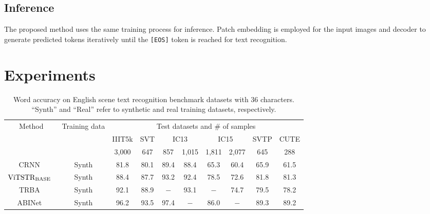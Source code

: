\documentclass[10pt,twocolumn,letterpaper]{article}
\begin{document}
\subsection{Inference}
The proposed method uses the same training process for inference. 
Patch embedding is employed for the input images and decoder to generate predicted tokens iteratively until the \texttt{[EOS]} token is reached for text recognition. 
\section{Experiments} \label{experiments}
\begin{table*}[tb]

\centering
   \caption{
Word accuracy on English scene text recognition benchmark datasets with 36 characters. 
``Synth'' and ``Real'' refer to synthetic and real training datasets, respectively.
}
\label{tab:method_overall_result_english}
\begin{tabular}{cccccccccc}
\toprule
\multirow{3}{*}{Method} &\multirow{3}{*}{Training data} & \multicolumn{8}{c}{Test datasets and \# of samples}                                                                                                                                                                \\ \cline{3-10} 
&                         & IIIT5k                   & SVT                      & \multicolumn{2}{c}{IC13}                            & \multicolumn{2}{c}{IC15}                            & SVTP                     & CUTE                     \\ &                         & 3,000                    & 647                      & 857                      & 1,015                    & 1,811                    & 2,077                    & 645                      & 288                      \\ 
\midrule
CRNN~\cite{shi2016crnn} & Synth &81.8 & 80.1 & 89.4 & 88.4 & 65.3 & 60.4 & 65.9 & 61.5 \\ 
$\textrm{ViTSTR}_{\rm BASE}$~\cite{atienza2021vitstr} & Synth & 88.4 & 87.7 & 93.2 & 92.4 & 78.5 & 72.6 & 81.8 & 81.3 \\
TRBA~\cite{baek2021TRBA} & Synth &92.1 & 88.9 & $-$ & 93.1 & $-$ & 74.7 & 79.5 & 78.2 \\
ABINet~\cite{fang2021ABINet} & Synth & 96.2 & 93.5 & 97.4 & $-$ & 86.0 & $-$ & 89.3 & 89.2 \\


\end{tabular}
\end{table*}
\end{document}
